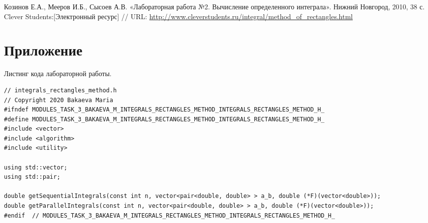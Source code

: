 \documentclass{report}
\begin{document}
\begin{thebibliography}{1}
 Козинов Е.А., Мееров И.Б., Сысоев А.В. «Лабораторная работа №2. Вычисление определенного интеграла». Нижний Новгород, 2010, 38 с. 
 Clever Students:[Электронный ресурс] // URL: \url {http://www.cleverstudents.ru/integral/method_of_rectangles.html}
\end{thebibliography}
\newpage

\section*{Приложение}
Листинг кода лабораторной работы.
\begin{lstlisting}
// integrals_rectangles_method.h
// Copyright 2020 Bakaeva Maria
#ifndef MODULES_TASK_3_BAKAEVA_M_INTEGRALS_RECTANGLES_METHOD_INTEGRALS_RECTANGLES_METHOD_H_
#define MODULES_TASK_3_BAKAEVA_M_INTEGRALS_RECTANGLES_METHOD_INTEGRALS_RECTANGLES_METHOD_H_
#include <vector>
#include <algorithm>
#include <utility>

using std::vector;
using std::pair;

double getSequentialIntegrals(const int n, vector<pair<double, double> > a_b, double (*F)(vector<double>));
double getParallelIntegrals(const int n, vector<pair<double, double> > a_b, double (*F)(vector<double>));
#endif  // MODULES_TASK_3_BAKAEVA_M_INTEGRALS_RECTANGLES_METHOD_INTEGRALS_RECTANGLES_METHOD_H_
\end{lstlisting}
\end{document}
